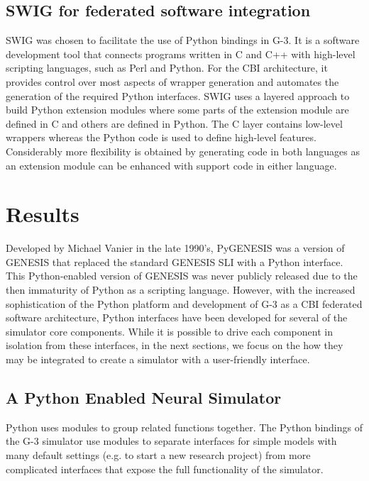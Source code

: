 \documentclass[12pt]{article}
\begin{document}
\subsection{SWIG for federated software integration}

SWIG was chosen to facilitate the use of Python bindings in G-3. It is
a software development tool that connects programs written in C and
C++ with high-level scripting languages, such as Perl and Python. For
the CBI architecture, it provides control over most aspects of wrapper
generation and automates the generation of the required Python
interfaces. SWIG uses a layered approach to build Python extension
modules where some parts of the extension module are defined in C and
others are defined in Python. The C layer contains low-level wrappers
whereas the Python code is used to define high-level features.
Considerably more flexibility is obtained by generating code in both
languages as an extension module can be enhanced with support code in
either language.

\section{Results}

Developed by Michael Vanier in the late 1990's, PyGENESIS was a
version of GENESIS that replaced the standard GENESIS SLI with a
Python interface\cite{vanier97:_genes_python}.  This Python-enabled
version of GENESIS was never publicly released due to the then
immaturity of Python as a scripting language.  However, with the
increased sophistication of the Python platform and development of G-3
as a CBI federated software architecture, Python interfaces have been
developed for several of the simulator core components.  While it is
possible to drive each component in isolation from these interfaces,
in the next sections, we focus on the how they may be integrated to
create a simulator with a user-friendly interface.

\subsection{A Python Enabled Neural Simulator}

Python uses modules to group related functions together.  The Python
bindings of the G-3 simulator use modules to separate interfaces for
simple models with many default settings (e.g. to start a new research
project) from more complicated interfaces that expose the full
functionality of the simulator.
\end{document}
